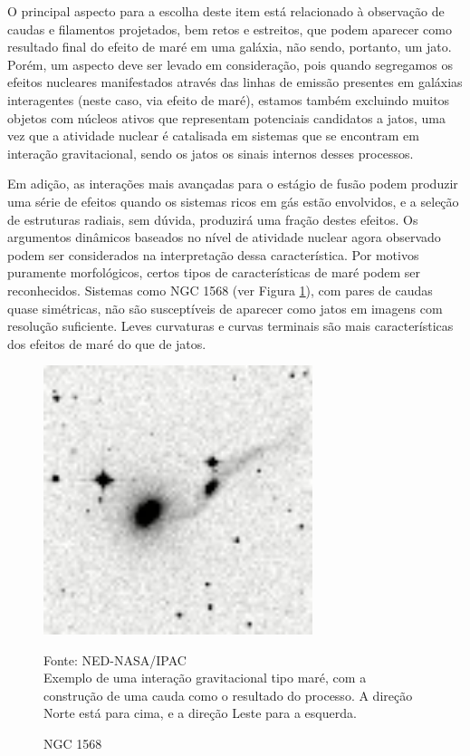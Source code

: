 \begin{enumerate}
O principal aspecto para a escolha deste item está relacionado à observação de caudas e filamentos projetados, bem retos e estreitos, que podem aparecer como resultado final do efeito de maré em uma galáxia, não sendo, portanto, um jato.
Porém, um aspecto deve ser levado em consideração, pois quando segregamos os efeitos nucleares manifestados através das linhas de emissão presentes em galáxias interagentes (neste caso, via efeito de maré), estamos também excluindo muitos objetos com núcleos ativos que representam potenciais candidatos a jatos, uma vez que a atividade nuclear é catalisada em sistemas que se encontram em interação gravitacional, sendo os jatos os sinais internos desses processos.

Em adição, as interações mais avançadas para o estágio de fusão podem produzir uma série de efeitos quando os sistemas ricos em gás estão envolvidos, e a seleção de estruturas radiais, sem dúvida, produzirá uma fração destes efeitos. Os argumentos dinâmicos baseados no nível de atividade nuclear agora observado podem ser considerados na interpretação dessa característica. Por motivos puramente morfológicos, certos tipos de características de maré podem ser reconhecidos. Sistemas como NGC 1568 (ver Figura \ref{fig:NGC-1568}), com pares de caudas quase simétricas, não são susceptíveis de aparecer como jatos em imagens com resolução suficiente. Leves curvaturas e curvas terminais são mais características dos efeitos de maré do que de jatos.

\begin{figure}[H]
	\centering	
    \caption{NGC 1568}
    \includegraphics[width=0.7\textwidth]{figuras/ngc1568.jpg}
   	\begin{center}
        \normalsize Fonte: NED-NASA/IPAC \\Exemplo de uma interação gravitacional tipo maré, com a construção de uma cauda como o resultado do processo. A direção Norte está para cima, e a direção Leste para a esquerda.
    \end{center}
	\label{fig:NGC-1568}
\end{figure}


\end{enumerate}
